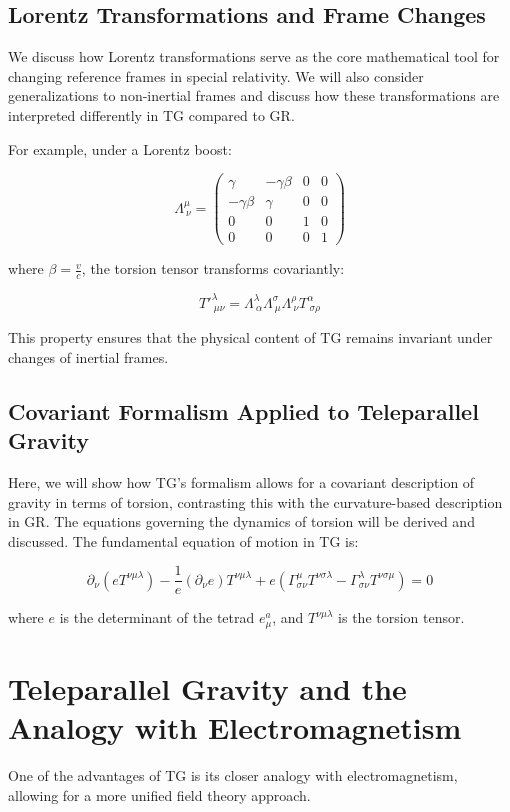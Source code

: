 \documentclass[12pt]{article}
\begin{document}
\subsection{Lorentz Transformations and Frame Changes}
We discuss how Lorentz transformations serve as the core mathematical tool for changing reference frames in special relativity. We will also consider generalizations to non-inertial frames and discuss how these transformations are interpreted differently in TG compared to GR.

For example, under a Lorentz boost:

\[
\Lambda^\mu_{\ \nu} = \begin{pmatrix}
\gamma & -\gamma \beta & 0 & 0 \\
-\gamma \beta & \gamma & 0 & 0 \\
0 & 0 & 1 & 0 \\
0 & 0 & 0 & 1
\end{pmatrix}
\]

where \( \beta = \frac{v}{c} \), the torsion tensor transforms covariantly:

\[
T'^\lambda_{\ \mu\nu} = \Lambda^\lambda_{\ \alpha} \Lambda^\sigma_{\ \mu} \Lambda^\rho_{\ \nu} T^\alpha_{\ \sigma\rho}
\]

This property ensures that the physical content of TG remains invariant under changes of inertial frames.

\subsection{Covariant Formalism Applied to Teleparallel Gravity}
Here, we will show how TG's formalism allows for a covariant description of gravity in terms of torsion, contrasting this with the curvature-based description in GR. The equations governing the dynamics of torsion will be derived and discussed. The fundamental equation of motion in TG is:

\[
\partial_\nu \left(e T^{\nu\mu\lambda}\right) - \frac{1}{e} \left( \partial_\nu e \right) T^{\nu\mu\lambda} + e \left( \Gamma^\mu_{\sigma\nu} T^{\nu\sigma\lambda} - \Gamma^\lambda_{\sigma\nu} T^{\nu\sigma\mu} \right) = 0
\]

where \( e \) is the determinant of the tetrad \( e^a_\mu \), and \( T^{\nu\mu\lambda} \) is the torsion tensor.

\section{Teleparallel Gravity and the Analogy with Electromagnetism}
One of the advantages of TG is its closer analogy with electromagnetism, allowing for a more unified field theory approach.
\end{document}
